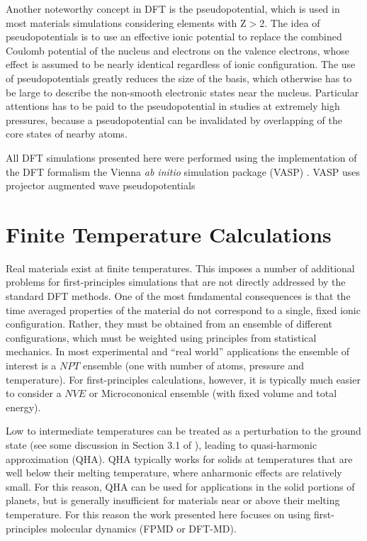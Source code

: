 Another noteworthy concept in DFT is the pseudopotential, which is  used in most
materials simulations considering elements with Z$>$2. The idea of pseudopotentials
is to use an effective ionic potential to replace the combined Coulomb potential of
the nucleus and electrons on the valence electrons, whose effect is assumed to be
nearly identical regardless of ionic configuration. The use of pseudopotentials
greatly reduces the size of the basis, which otherwise has to be large to describe
the non-smooth electronic states near the nucleus. Particular attentions has to be
paid to the pseudopotential in studies at extremely high pressures, because a
pseudopotential can be invalidated by overlapping of the core states of nearby atoms.


All DFT simulations presented here were performed using the implementation of the DFT
formalism the Vienna {\it ab initio} simulation package (VASP) \citep{Kresse1996}.
VASP uses projector augmented wave pseudopotentials \citep{Blochl1994} 

\section{Finite Temperature Calculations}

Real materials exist at finite temperatures. This imposes a number of additional
problems for first-principles simulations that are not directly addressed by the 
standard DFT methods. One of the most fundamental consequences is that the time
averaged properties of the material do not correspond to a single, fixed ionic
configuration. Rather, they must be obtained from an ensemble of different
configurations, which must be weighted using principles from statistical mechanics.
In most experimental and ``real world'' applications the ensemble of interest is a
$NPT$ ensemble (one with number of atoms, pressure and temperature). For
first-principles calculations, however, it is typically much easier to consider a
$NVE$ or Microcononical ensemble (with fixed volume and total energy).

Low to intermediate temperatures can be treated as a perturbation to the ground state
(see some discussion in Section 3.1 of \cite{martin-esbook}), leading to
quasi-harmonic approximation (QHA). QHA typically works for solids at temperatures
that are well below their melting temperature, where anharmonic effects are relatively
small. For this reason, QHA can be used for applications in the solid portions of
planets, but is generally insufficient for materials near or above their melting
temperature. For this reason the work presented here focuses on using
first-principles molecular dynamics (FPMD or DFT-MD).

